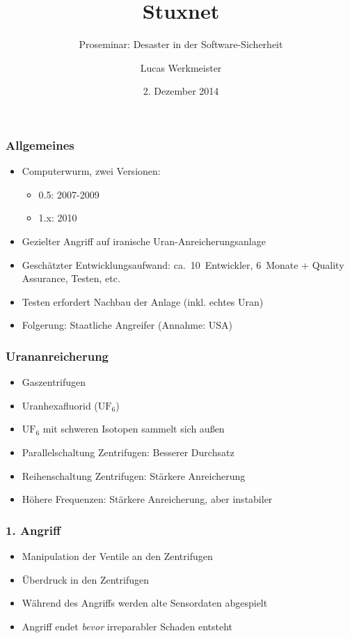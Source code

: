 \documentclass{beamer}
\title{Stuxnet}
\subtitle{Proseminar: Desaster in der Software-Sicherheit}
\author{Lucas Werkmeister}
\date{2. Dezember 2014}
\begin{document}
\newcommand{\ufsechs}[0]{$\mathrm{UF_6}$\xspace}

\begin{frame}
  \titlepage
\end{frame}

\begin{frame}
  \frametitle{Allgemeines}
  \begin{itemize}
    \item Computerwurm, zwei Versionen:
      \begin{itemize}
        \item 0.5: 2007-2009
        \item 1.x: 2010
      \end{itemize}
    \item Gezielter Angriff auf iranische Uran-Anreicherungsanlage
    \item Geschätzter Entwicklungsaufwand: ca.~10~Entwickler, 6~Monate + Quality Assurance, Testen, etc.
    \item Testen erfordert Nachbau der Anlage (inkl. echtes Uran)
    \item Folgerung: Staatliche Angreifer (Annahme: USA)
  \end{itemize}
\end{frame}

\begin{frame}
  \frametitle{Urananreicherung}
  \begin{itemize}
    \item Gaszentrifugen
    \item Uranhexafluorid (\ufsechs)
    \item \ufsechs mit schweren Isotopen sammelt sich außen
    \item Parallelschaltung Zentrifugen: Besserer Durchsatz
    \item Reihenschaltung Zentrifugen: Stärkere Anreicherung
    \item Höhere Frequenzen: Stärkere Anreicherung, aber instabiler
  \end{itemize}
\end{frame}

\begin{frame}
  \frametitle{1. Angriff}
  \begin{itemize}
    \item Manipulation der Ventile an den Zentrifugen
    \item Überdruck in den Zentrifugen
    \item Während des Angriffs werden alte Sensordaten abgespielt
    \item Angriff endet \emph{bevor} irreparabler Schaden entsteht
  \end{itemize}
\end{frame}
\end{document}
